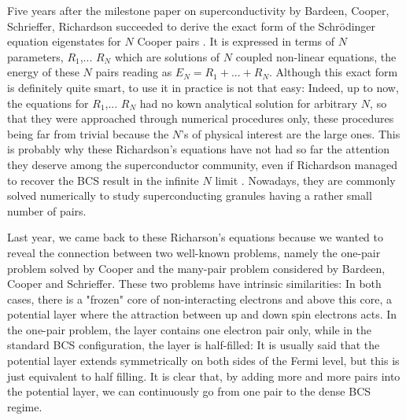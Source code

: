 \documentclass[aps,prb,superscriptaddress,twocolumn]{revtex4}
\begin{document}
Five years after the milestone paper on superconductivity by Bardeen,
Cooper, Schrieffer\cite{BCS}, Richardson succeeded to derive the exact form of the Schr\"{o}dinger equation eigenstates for $N$ Cooper pairs%
\cite{Richardson1,Richardson2}. It is expressed in terms
of $N$ parameters, $R_{1}$,... $R_{N}$ which are solutions of $N$ coupled
non-linear equations, the energy of these $N$ pairs reading as $E
_{N}=R_{1}+...+R_{N}$. Although this exact form is definitely quite smart, to
use it in practice is not that easy: Indeed, up to now, the equations for $R_{1}$,... $R_{N}$ had no
kown analytical solution for arbitrary $N$, so that they were approached through
numerical procedures only, these procedures being far from trivial because the $N$'s of physical interest are the large ones. This is probably why these Richardson's equations have not had so far the
attention they deserve among the superconductor community, even if Richardson managed to recover the BCS result in the infinite $N$ limit \cite{Richardson3}. Nowadays, they
are commonly solved numerically to study superconducting
granules having a rather small number of pairs.

Last year, we came back to  these Richarson's equations because we wanted to reveal the connection between two well-known problems, namely the
one-pair problem solved by Cooper and the many-pair problem considered by Bardeen, Cooper and Schrieffer. These two problems have intrinsic similarities: In
both cases, there is a "frozen" core of non-interacting electrons and above this core, a potential layer where the attraction between up and
down spin electrons acts. In the one-pair problem, the layer contains one electron pair only, while in the standard BCS configuration, the
layer is half-filled: It is usually said that the potential layer extends symmetrically on both sides of the Fermi level, but this is just equivalent to half filling.
It is clear that, by adding more and more pairs into the potential layer, we can continuously go from one pair to the dense BCS regime. 
\end{document}
